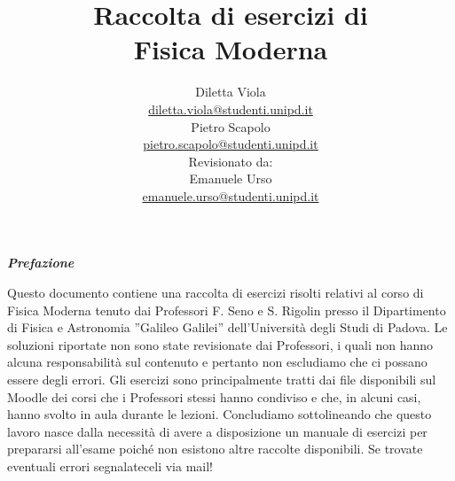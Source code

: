 \documentclass[12pt,twoside,a4]{article}
\begin{document}
\setlength{\headheight}{15.2pt}

\title{Raccolta di esercizi di \\Fisica Moderna}
\author{Diletta Viola \\ \small{\href{mailto:\\ diletta.viola@studenti.unipd.it}{diletta.viola@studenti.unipd.it}}\\
\Large Pietro Scapolo \\ \small{\href{mailto:\\ pietro.scapolo@studenti.unipd.it}{pietro.scapolo@studenti.unipd.it}}\\
\vspace*{5em}
\small{Revisionato da:} \\
\Large Emanuele Urso \\ \small{\href{mailto:\\ emanuele.urso@studenti.unipd.it}{emanuele.urso@studenti.unipd.it} 
}}
\maketitle[toc=off]
\pagestyle{empty}
\vspace*{\fill} 
\begin{center}
    \textit{\textbf{ \Huge Prefazione}}
\end{center}
    \begin{adjustwidth}{0.15\textwidth}{0.15\textwidth}
    \begin{center}
    Questo documento contiene una raccolta di esercizi risolti relativi al corso di Fisica Moderna tenuto dai Professori F. Seno e S. Rigolin presso il Dipartimento di Fisica e Astronomia ”Galileo Galilei” dell'Università degli Studi di Padova. Le soluzioni riportate non sono state revisionate dai Professori, i quali non hanno alcuna responsabilità sul contenuto e pertanto non escludiamo che ci possano essere degli errori. Gli esercizi sono principalmente tratti dai file disponibili sul Moodle dei corsi che i Professori stessi hanno condiviso e che, in alcuni casi, hanno svolto in aula durante le lezioni. 
    Concludiamo sottolineando che questo lavoro nasce dalla necessità di avere a disposizione un manuale di esercizi per prepararsi all'esame poiché non esistono altre raccolte disponibili.
    Se trovate eventuali errori segnalateceli via mail!
    \end{center}
    \end{adjustwidth}


\setcounter{tocdepth}{2}
\end{document}
